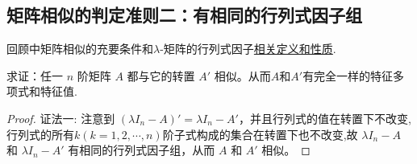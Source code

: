 \documentclass[../../main.tex]{subfiles}%
\begin{document}
\subsection{矩阵相似的判定准则二：有相同的行列式因子组}

回顾中矩阵相似的充要条件和$\lambda$-矩阵的行列式因子\hyperref[lemma:i阶行列式因子整除i+1阶行列式因子]{相关定义和性质}.

\begin{proposition}[矩阵必与其转置相似]\label{proposition:lambda-矩阵一定与其转置相似}
求证：任一 $n$ 阶矩阵 $A$ 都与它的转置 $A'$ 相似。从而$A$和$A'$有完全一样的特征多项式和特征值.
\end{proposition}
\begin{proof}

{\color{blue} 证法一:}
注意到 $(\lambda I_n - A)' = \lambda I_n - A'$，并且行列式的值在转置下不改变,行列式的所有$k(k=1,2,\cdots,n)$阶子式构成的集合在转置下也不改变,故 $\lambda I_n - A$ 和 $\lambda I_n - A'$ 有相同的行列式因子组，从而 $A$ 和 $A'$ 相似。


\end{proof}
\end{document}

